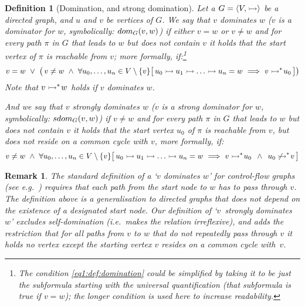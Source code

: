\documentclass[submission,copyright,creativecommons]{eptcs}
\newtheorem{definition}[theorem]{Definition}
\newtheorem{remark}[theorem]{Remark}
\newcommand{\bfunap}[3]{{#1}({#2,#3})}
\renewcommand\;{\,}
\newcommand{\sdiredge}{{\rightarrowtail}}
\newcommand{\diredge}{\mathrel{\sdiredge}}
\newcommand{\srtcdiredge}{{\rightarrowtail^*}}
\newcommand{\rtcdiredge}{\mathrel{\srtcdiredge}\hspace*{-2pt}}
\newcommand{\snotrtcdiredge}{{{\not\rightarrowtail}^*}}
\newcommand{\notrtcdiredge}{\mathrel{\snotrtcdiredge}\hspace*{-2pt}}
\newcommand{\sdom}[1]{{{\mit dom}_{#1}}}
\newcommand{\dom}[3]{\bfunap{\sdom{#1}}{#2}{#3}}
\newcommand{\sstrongdom}[1]{{{\mit sdom}_{#1}}}
\newcommand{\strongdom}[3]{\bfunap{\sstrongdom{#1}}{#2}{#3}}
\newcommand{\adigraph}{G}
\newcommand{\verts}{V}
\newcommand{\pair}[2]{\langle {#1},\hspace*{0.5pt} {#2} \rangle}
\begin{document}
\begin{definition}[Domination, and strong domination]\normalfont\label{def:domination}
Let a $ \adigraph = \pair{\verts}{\sdiredge} $ be a directed graph,
  and $u$ and $v$ be vertices of $\adigraph$.
  We say that $v$ \emph{dominates} $w$ ($v$ is a \emph{dominator} for $w$, symbolically: $\dom{\adigraph}{v}{w}$) if either $ v = w$ or
  $v \neq w$ and for every path $\pi$ in $\adigraph$ that leads to $w$ but does not contain $v$
  it holds that the start vertex of $\pi$ is reachable from $v$;
  more formally, if:\footnote{The condition \ref{eq1:def:domination} could be simplified by taking it to be just the
      subformula starting with the universal quantification
      (that subformula is true if $v=w$); the longer condition is used here to increase readability.}
\begin{equation}\label{eq1:def:domination}
v = w 
      \;\;\vee\;\;
    \bigl(\,  
    v \neq w \;\;\land\;\;
    \forall u_0, \ldots, u_n\in\verts\setminus\{v\}
      \bigl[\, u_0 \diredge u_1 \diredge \ldots \diredge u_n = w
\;\;\Longrightarrow\;\;
               v \rtcdiredge u_0 \,\bigr]
    \bigr)           
\end{equation}
Note that $v \rtcdiredge w$ holds if $v$ dominates $w$. 
  
  And we say that $v$ \emph{strongly dominates} $w$ 
  ($v$ is a \emph{strong dominator} for $w$, symbolically: $\strongdom{\adigraph}{v}{w}$)  if $v \neq w$ and for every path $\pi$ in $\adigraph$ that leads to $w$ but does not contain $v$
  it holds that the start vertex $u_0$ of $\pi$ is reachable from $v$, but does not reside on a common cycle with $v$,
  more formally, if:
\begin{equation}\label{eq2:def:domination}
v \neq w \;\;\land\;\;
    \forall u_0, \ldots, u_n\in\verts\setminus\{v\}
      \bigl[\, u_0 \diredge u_1 \diredge \ldots \diredge u_n = w
\;\;\Longrightarrow\;\;
               v \rtcdiredge u_0 
               \;\;\;\land\;\;\;
               u_0 \notrtcdiredge v
               \,\bigr]
\end{equation}
\end{definition}

\begin{remark}\normalfont
The standard definition of a `$v$ dominates $w$' for control-flow graphs (see e.g.~\cite{hech:ullm:1974}) 
  requires that each path from the start node to $w$ has to pass through $v$.
  The definition above is a generalisation to directed graphs that does not depend
  on the existence of a designated start node. 
Our definition of `$v$~strongly dominates $w$' excludes self-domination (i.e.\ makes the relation irreflexive),
  and adds the restriction 
  that for all paths from $v$ to $w$ that do not repeatedly pass through $v$
  it holds no vertex except the starting vertex $v$ resides on a common cycle with~$v$.
\end{remark}
\end{document}

